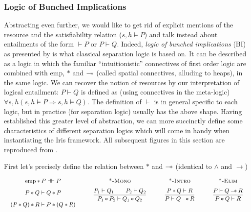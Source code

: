 \subsubsection{Logic of Bunched Implications}
\label{sec:bi}
Abstracting even further, we would like to get rid of explicit mentions of the resource and the satisfiability relation ($s, h \models P$) and talk instead about
entailments of the form $\vdash P$ or $P \vdash Q$. Indeed, \emph{logic of bunched implications} (BI) as presented by \citep{bi} is what classical separation logic is
based on. It can be described as a logic in which the familiar ``intuitionistic'' connectives of first order logic are combined with $\mathrm{emp}$, $*$ and $\mathbin{-\!*}$ (called spatial connectives, alluding to heaps),
in the same logic. We can recover the notion of resources by our interpretation of logical entailment: $P \vdash Q$ is defined as (using connectives in the meta-logic)
$\forall s,h (s,h \models P \Rightarrow s, h \models Q)$. The definition of $\vdash$ is in general specific to each logic, but in practice (for separation logic) usually
has the above shape. Having established this greater level of abstraction, we can more succinctly define some characteristics of different
separation logics which will come in handy when instantiating the Iris framework. All subsequent figures in this section are reproduced from \citep{mosel}.

First let's precisely define the relation between $*$ and $\mathbin{-\!*}$ (identical to $\wedge$ and $\to$)

\[
\begin{array}{c@{\qquad}c@{\qquad}c@{\qquad}c}
\begin{array}[t]{c}
\mathrm{emp} * P \dashv\vdash P \\[0.8em]
P * Q \vdash Q * P \\[0.8em]
(P * Q) * R \vdash P * (Q * R)
\end{array}
&
\begin{array}[t]{c}
\text{\textsc{*-Mono}} \\[0.6em]
\dfrac{P_1 \vdash Q_1 \qquad P_2 \vdash Q_2}{P_1 * P_2 \vdash Q_1 * Q_2}
\end{array}
&
\begin{array}[t]{c}
\text{\textsc{*-Intro}} \\[0.6em]
\dfrac{P * Q \vdash R}{P \vdash Q \mathbin{-\!*} R}
\end{array}
&
\begin{array}[t]{c}
\text{\textsc{*-Elim}} \\[0.6em]
\dfrac{P \vdash Q \mathbin{-\!*} R}{P * Q \vdash R}
\end{array}
\end{array}
\]

